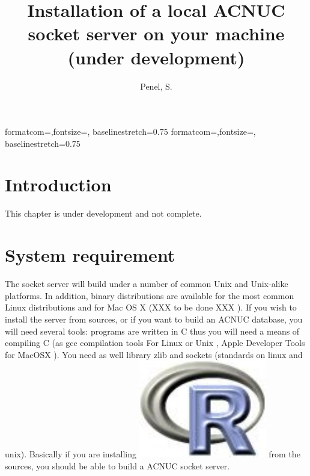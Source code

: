 \documentclass{article}
\title{Installation of a local ACNUC socket server on your machine (under development)}
\author{Penel, S.}
\begin{document}
%
%
{formatcom={\color{Sinput}},fontsize=\footnotesize, baselinestretch=0.75}
{formatcom={\color{Soutput}},fontsize=\footnotesize, baselinestretch=0.75}
%
%
\newcommand{\Rlogo}{\protect\includegraphics[height=1.8ex,keepaspectratio]{../figs/Rlogo.pdf}}
%
%
\newcommand{\seqinr}{\texttt{seqin\bf{R}}}
\newcommand{\Seqinr}{\texttt{Seqin\bf{R}}}
%
%
%
%
%


\maketitle
\tableofcontents



\section{Introduction}

This chapter is under development and not complete.

\section{System requirement}

The socket server will build under a number of common Unix and Unix-alike
platforms.  In addition, binary distributions are available for the most
common Linux distributions and for Mac OS X  (XXX to be done XXX ). If you wish
to install the server from sources, or if you want to build an ACNUC database,
you will need several tools: programs are written in C thus you will need a
means of compiling C (as gcc compilation tools For Linux or Unix , Apple
Developer Tools  for MacOSX ). You need as well library zlib and sockets
(standards on linux and unix). Basically if you are installing \Rlogo{} from the
sources, you should be able to build a ACNUC socket server.
\end{document}
